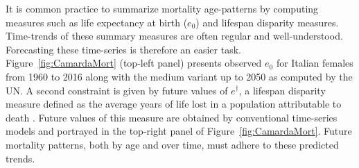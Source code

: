 \documentclass[12pt,a4paper,twoside]{article}
\begin{document}
It is common practice to summarize mortality age-patterns by computing measures such as life expectancy at birth ($e_{0}$) and lifespan disparity measures. Time-trends of these summary measures are often regular and well-understood. Forecasting these time-series is therefore an easier task. Figure~\ref{fig:CamardaMort} (top-left panel) presents observed $e_{0}$ for Italian females from 1960 to 2016 along with the medium variant up to 2050 as computed by the UN. A second constraint is given by future values of $e^{\dagger}$, a lifespan disparity measure defined as the average years of life lost in a population attributable to death \citep{VaupelCRdemo2003}. Future values of this measure are obtained by conventional time-series models and portrayed in the top-right panel of Figure~\ref{fig:CamardaMort}. Future mortality patterns, both by age and over time, must adhere to these predicted trends.
\end{document}

